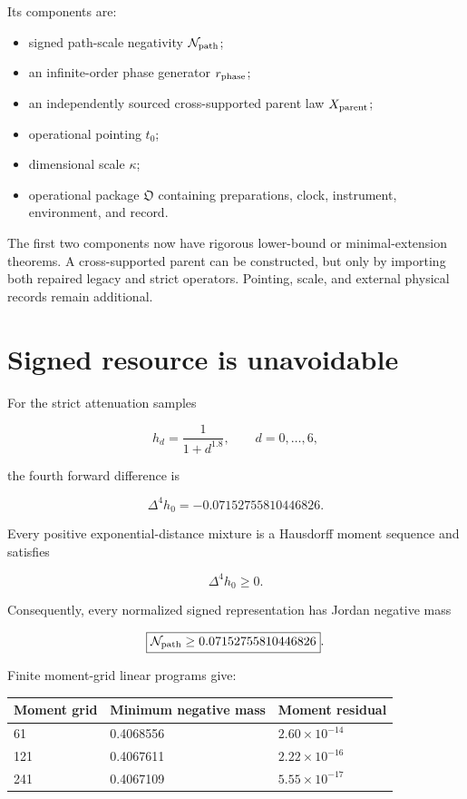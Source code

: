 \documentclass[11pt,a4paper,openany]{report}
\begin{document}
Its components are:

\begin{itemize}
\item 
signed path-scale negativity \(\mathcal N_{\rm path}\);

\item 
an infinite-order phase generator \(r_{\rm phase}\);

\item 
an independently sourced cross-supported parent law \(X_{\rm parent}\);

\item 
operational pointing \(t_0\);

\item 
dimensional scale \(\kappa\);

\item 
operational package \(\mathfrak O\) containing preparations, clock, instrument, environment, and record.

\end{itemize}

The first two components now have rigorous lower-bound or minimal-extension theorems. A cross-supported parent can be constructed, but only by importing both repaired legacy and strict operators. Pointing, scale, and external physical records remain additional.

\section{Signed resource is unavoidable}

For the strict attenuation samples

\[
h_d=\frac{1}{1+d^{1.8}},
\qquad d=0,\ldots,6,
\]

the fourth forward difference is

\[
\Delta^4h_0=-0.07152755810446826.
\]

Every positive exponential-distance mixture is a Hausdorff moment sequence and satisfies

\[
\Delta^4h_0\ge0.
\]

Consequently, every normalized signed representation has Jordan negative mass

\[
\boxed{
\mathcal N_{\rm path}
\ge
0.07152755810446826
}.
\]

Finite moment-grid linear programs give:

\begin{center}
\begingroup\small
\setlength{\tabcolsep}{2.5pt}
\renewcommand{\arraystretch}{1.16}
\begin{longtable}{@{}p{}p{}p{}@{}}
\toprule
\textbf{Moment grid} & \textbf{Minimum negative mass} & \textbf{Moment residual} \\
\midrule
\endhead
61 & 0.4068556 & \(2.60\times10^{-14}\) \\
121 & 0.4067611 & \(2.22\times10^{-16}\) \\
241 & 0.4067109 & \(5.55\times10^{-17}\) \\
\bottomrule
\end{longtable}
\endgroup
\end{center}
\end{document}
